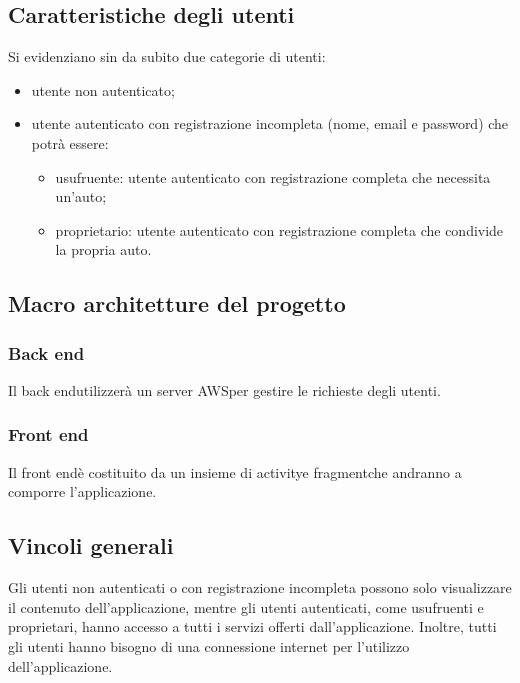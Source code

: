 \subsection{Caratteristiche degli utenti}
Si evidenziano sin da subito due categorie di utenti:
\begin{itemize}
	\item utente non autenticato;
	\item utente autenticato con registrazione incompleta (nome, email e password) che potrà essere:
		\begin{itemize}
			\item usufruente: utente autenticato con registrazione completa che necessita un'auto;
			\item proprietario: utente autenticato con registrazione completa che condivide la propria auto.
		\end{itemize}
\end{itemize}

\subsection{Macro architetture del progetto}
\subsubsection{Back end}
Il back end\glosp utilizzerà un server AWS\glosp per gestire le richieste degli utenti.

\subsubsection{Front end}
Il front end\glosp è costituito da un insieme di activity\glosp e fragment\glosp che andranno a comporre l'applicazione. 

\subsection{Vincoli generali}
Gli utenti non autenticati o con registrazione incompleta possono solo visualizzare il contenuto dell'applicazione, mentre gli utenti autenticati, come usufruenti e proprietari, hanno accesso a tutti i servizi offerti dall'applicazione. Inoltre, tutti gli utenti hanno bisogno di una connessione internet per l'utilizzo dell'applicazione.

 
